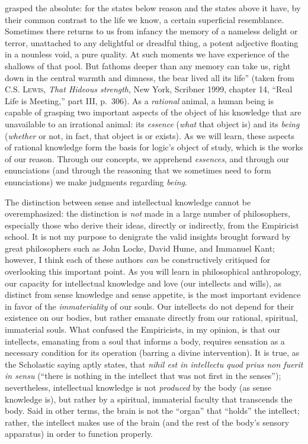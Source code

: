 \documentclass[
  12pt,
]{memoir}
\begin{document}
{  grasped the absolute: for the states below reason and the states above
  it have, by their common contrast to the life we know, a certain
  superficial resemblance. Sometimes there returns to us from infancy
  the memory of a nameless delight or terror, unattached to any
  delightful or dreadful thing, a potent adjective floating in a
  nounless void, a pure quality. At such moments we have experience of
  the shallows of that pool. But fathoms deeper than any memory can take
  us, right down in the central warmth and dimness, the bear lived all
  its life'' (taken from \textsc{C.S. Lewis}, \emph{That Hideous
  strength}, New York, Scribner 1999, chapter 14, ``Real Life is
  Meeting,'' part III, p.~306).} As a \emph{rational} animal, a human
being is capable of grasping two important aspects of the object of his
knowledge that are unavailable to an irrational animal: its
\emph{essence} (\emph{what} that object is) and its \emph{being}
(\emph{whether} or not, in fact, that object is or exists). As we will
learn, these aspects of rational knowledge form the basis for logic's
object of study, which is the works of our reason. Through our concepts,
we apprehend \emph{essences}, and through our enunciations (and through
the reasoning that we sometimes need to form enunciations) we make
judgments regarding \emph{being}.

The distinction between sense and intellectual knowledge cannot be
overemphasized: the distinction is \emph{not} made in a large number of
philosophers, especially those who derive their ideas, directly or
indirectly, from the Empiricist school. It is not my purpose to
denigrate the valid insights brought forward by great philosophers such
as John Locke, David Hume, and Immanuel Kant; however, I think each of
these authors \emph{can} be constructively critiqued for overlooking
this important point. As you will learn in philosophical anthropology,
our capacity for intellectual knowledge and love (our intellects and
wills), as distinct from sense knowledge and sense appetite, is the most
important evidence in favor of the \emph{immateriality} of our souls.
Our intellects do not depend for their existence on our bodies, but
rather emanate directly from our rational, spiritual, immaterial souls.
What confused the Empiricists, in my opinion, is that our intellects,
emanating from a soul that informs a body, requires sensation as a
necessary condition for its operation (barring a divine intervention).
It is true, as the Scholastic saying aptly states, that \emph{nihil est
in intellectu quod prius non fuerit in sensu} (``there is nothing in the
intellect that was not first in the senses''); nevertheless,
intellectual knowledge is not \emph{produced} by the body (as sense
knowledge is), but rather by a spiritual, immaterial faculty that
transcends the body. Said in other terms, the brain is not the ``organ''
that ``holds'' the intellect; rather, the intellect makes use of the
brain (and the rest of the body's sensory apparatus) in order to
function properly.
\end{document}
